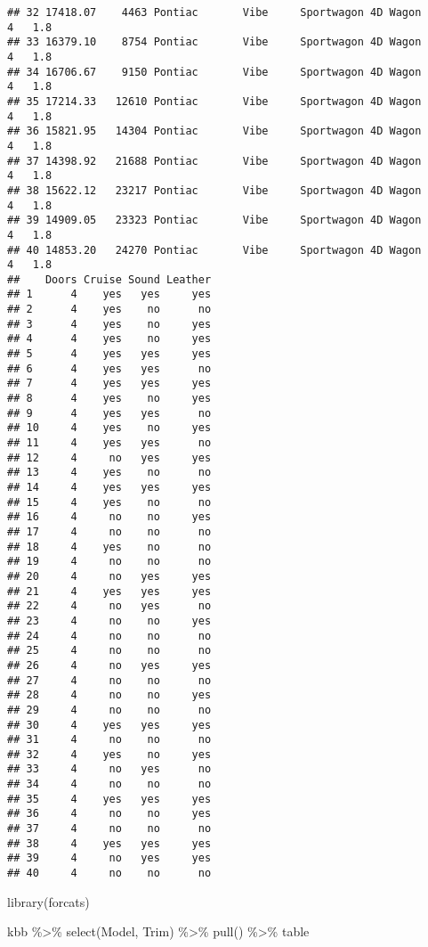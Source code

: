 \documentclass[
]{article}
\newenvironment{Shaded}{\begin{snugshade}}{\end{snugshade}}
\newcommand{\FunctionTok}[1]{\textcolor[rgb]{0.00,0.00,0.00}{#1}}
\newcommand{\NormalTok}[1]{#1}
\newcommand{\SpecialCharTok}[1]{\textcolor[rgb]{0.00,0.00,0.00}{#1}}
\begin{document}
\begin{verbatim}
## 32 17418.07    4463 Pontiac       Vibe     Sportwagon 4D Wagon        4   1.8
## 33 16379.10    8754 Pontiac       Vibe     Sportwagon 4D Wagon        4   1.8
## 34 16706.67    9150 Pontiac       Vibe     Sportwagon 4D Wagon        4   1.8
## 35 17214.33   12610 Pontiac       Vibe     Sportwagon 4D Wagon        4   1.8
## 36 15821.95   14304 Pontiac       Vibe     Sportwagon 4D Wagon        4   1.8
## 37 14398.92   21688 Pontiac       Vibe     Sportwagon 4D Wagon        4   1.8
## 38 15622.12   23217 Pontiac       Vibe     Sportwagon 4D Wagon        4   1.8
## 39 14909.05   23323 Pontiac       Vibe     Sportwagon 4D Wagon        4   1.8
## 40 14853.20   24270 Pontiac       Vibe     Sportwagon 4D Wagon        4   1.8
##    Doors Cruise Sound Leather
## 1      4    yes   yes     yes
## 2      4    yes    no      no
## 3      4    yes    no     yes
## 4      4    yes    no     yes
## 5      4    yes   yes     yes
## 6      4    yes   yes      no
## 7      4    yes   yes     yes
## 8      4    yes    no     yes
## 9      4    yes   yes      no
## 10     4    yes    no     yes
## 11     4    yes   yes      no
## 12     4     no   yes     yes
## 13     4    yes    no      no
## 14     4    yes   yes     yes
## 15     4    yes    no      no
## 16     4     no    no     yes
## 17     4     no    no      no
## 18     4    yes    no      no
## 19     4     no    no      no
## 20     4     no   yes     yes
## 21     4    yes   yes     yes
## 22     4     no   yes      no
## 23     4     no    no     yes
## 24     4     no    no      no
## 25     4     no    no      no
## 26     4     no   yes     yes
## 27     4     no    no      no
## 28     4     no    no     yes
## 29     4     no    no      no
## 30     4    yes   yes     yes
## 31     4     no    no      no
## 32     4    yes    no     yes
## 33     4     no   yes      no
## 34     4     no    no      no
## 35     4    yes   yes     yes
## 36     4     no    no     yes
## 37     4     no    no      no
## 38     4    yes   yes     yes
## 39     4     no   yes     yes
## 40     4     no    no      no
\end{verbatim}

\begin{Shaded}
\begin{Highlighting}[]
\FunctionTok{library}\NormalTok{(forcats)}

\NormalTok{kbb }\SpecialCharTok{\%\textgreater{}\%} \FunctionTok{select}\NormalTok{(Model, Trim) }\SpecialCharTok{\%\textgreater{}\%} \FunctionTok{pull}\NormalTok{() }\SpecialCharTok{\%\textgreater{}\%}\NormalTok{ table}
\end{Highlighting}
\end{Shaded}
\end{document}
